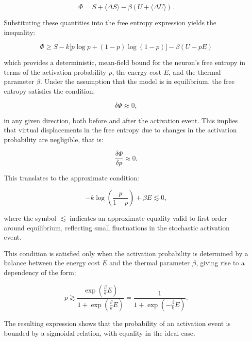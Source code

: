 \documentclass[12pt]{article}
\begin{document}
\begin{equation}
\Phi = S + \langle \Delta S \rangle - \beta (U + \langle \Delta U\rangle).
\end{equation}

Substituting these quantities into the free entropy expression yields the inequality:

\begin{equation}
\Phi \ge S - k \big[ p \log p + (1-p) \log(1-p) \big] - \beta (U - p E)
\end{equation}

which provides a deterministic, mean-field bound for the neuron’s free entropy in terms of the activation probability $p$, the energy cost $E$, and the thermal parameter $\beta$. Under the assumption that the model is in equilibrium, the free entropy satisfies the condition:

\begin{equation}
\delta \Phi \approx 0,
\end{equation}

in any given direction, both before and after the activation event. This implies that virtual displacements in the free entropy due to changes in the activation probability are negligible, that is:

\begin{equation}
\frac{\delta \Phi}{\delta p} \approx 0.
\end{equation}

This translates to the approximate condition:

\begin{equation}
- k \log \left( \frac{p}{1-p} \right) + \beta E \lesssim 0,
\end{equation}

where the symbol $\lesssim$ indicates an approximate equality valid to first order around equilibrium, reflecting small fluctuations in the stochastic activation event.

This condition is satisfied only when the activation probability is determined by a balance between the energy cost $E$ and the thermal parameter $\beta$, giving rise to a dependency of the form:

\begin{equation}
p \gtrsim \frac{\exp\left(\frac{\beta}{k} E\right)}{1 + \exp\left(\frac{\beta}{k} E\right)} = \frac{1}{1 + \exp\left(-\frac{\beta}{k} E\right)}.
\end{equation}

The resulting expression shows that the probability of an activation event is bounded by a sigmoidal relation, with equality in the ideal case.
\end{document}

